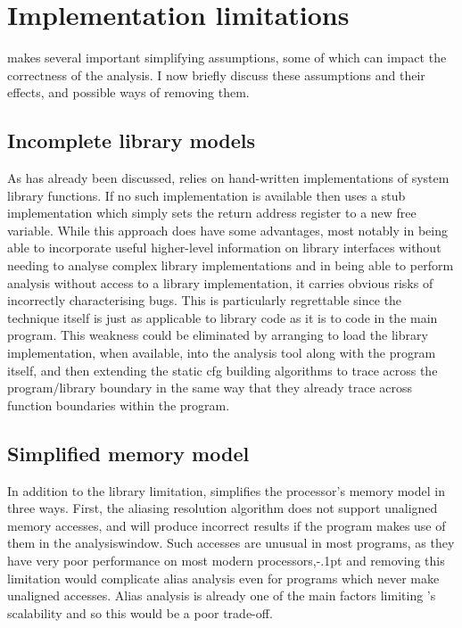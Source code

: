 \section{Implementation limitations}
{\Implementation} makes several important simplifying assumptions,
some of which can impact the correctness of the analysis.  I now
briefly discuss these assumptions and their effects, and possible ways
of removing them.

\subsection{Incomplete library models}
As has already been discussed, {\implementation} relies on
hand-written {\StateMachine} implementations of system library
functions.  If no such implementation is available then
{\implementation} uses a stub implementation which simply sets the
return address register to a new free variable.  While this approach
does have some advantages, most notably in being able to incorporate
useful higher-level information on library interfaces without needing
to analyse complex library implementations and in being able to
perform analysis without access to a library implementation, it
carries obvious risks of incorrectly characterising bugs.  This is
particularly regrettable since the {\technique} technique itself is
just as applicable to library code as it is to code in the main
program.  This weakness could be eliminated by arranging to load the
library implementation, when available, into the {\implementation}
analysis tool along with the program itself, and then extending the
\gls{static cfg} building algorithms to trace across the
program/library boundary in the same way that they already trace
across function boundaries within the program.

\subsection{Simplified memory model}
\label{sect:derive:simpl_mem_model}

In addition to the library limitation, {\implementation} simplifies
the processor's memory model in three ways.  First, the aliasing
resolution algorithm does not support unaligned memory accesses, and
will produce incorrect results if the program makes use of them in the
\gls{analysiswindow}.  Such accesses are unusual in most programs, as
they have very poor performance on most modern
processors,\kern-.1pt and removing this limitation would
complicate alias analysis even for programs which never make unaligned
accesses.  Alias analysis is already one of the main factors limiting
{\implementation}'s scalability and so this would be a poor trade-off.

